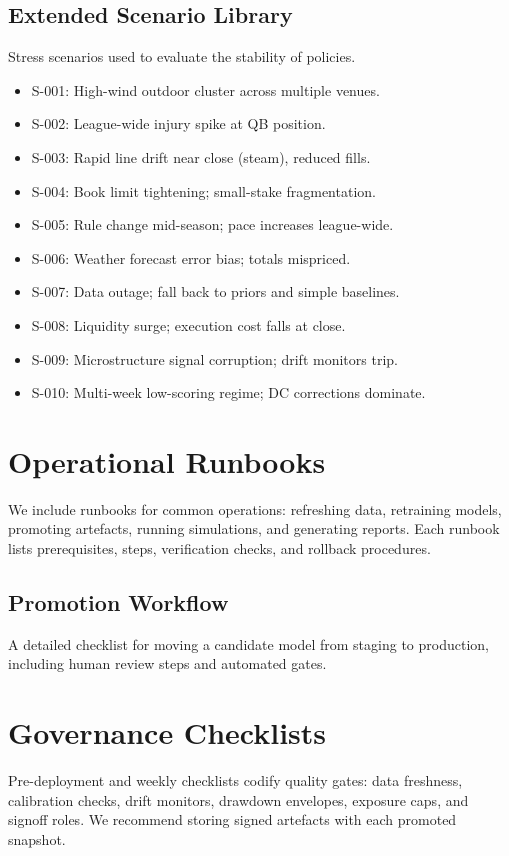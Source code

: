 \subsection{Extended Scenario Library}
Stress scenarios used to evaluate the stability of policies.
\begin{itemize}
  \item S-001: High-wind outdoor cluster across multiple venues.
  \item S-002: League-wide injury spike at QB position.
  \item S-003: Rapid line drift near close (steam), reduced fills.
  \item S-004: Book limit tightening; small-stake fragmentation.
  \item S-005: Rule change mid-season; pace increases league-wide.
  \item S-006: Weather forecast error bias; totals mispriced.
  \item S-007: Data outage; fall back to priors and simple baselines.
  \item S-008: Liquidity surge; execution cost falls at close.
  \item S-009: Microstructure signal corruption; drift monitors trip.
  \item S-010: Multi-week low-scoring regime; DC corrections dominate.
\end{itemize}

\section{Operational Runbooks}\label{app:runbooks}
We include runbooks for common operations: refreshing data, retraining models, promoting artefacts, running simulations, and generating reports. Each runbook lists prerequisites, steps, verification checks, and rollback procedures.

\subsection{Promotion Workflow}
A detailed checklist for moving a candidate model from staging to production, including human review steps and automated gates.

\section{Governance Checklists}\label{app:gov-checklists}
Pre-deployment and weekly checklists codify quality gates: data freshness, calibration checks, drift monitors, drawdown envelopes, exposure caps, and signoff roles. We recommend storing signed artefacts with each promoted snapshot.

